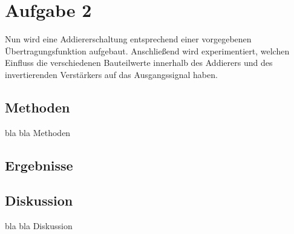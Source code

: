 \section{Aufgabe 2}
Nun wird eine Addiererschaltung entsprechend einer vorgegebenen Übertragungsfunktion aufgebaut. Anschließend wird experimentiert, welchen Einfluss die verschiedenen Bauteilwerte innerhalb des Addierers und des invertierenden Verstärkers auf das Ausgangssignal haben.

\subsection{Methoden}
bla bla Methoden

\subsection{Ergebnisse}







\subsection{Diskussion}
bla bla Diskussion


